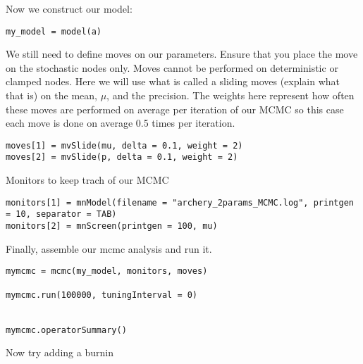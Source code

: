 Now we construct our model:

{\tt \begin{snugshade*}
 \begin{lstlisting}
my_model = model(a)
\end{lstlisting}
\end{snugshade*}}


We still need to define moves on our parameters. Ensure that you place the move on the stochastic nodes only. Moves cannot be performed on deterministic or clamped nodes. Here we will use what is called a sliding moves (explain what that is) on the mean, $\mu$, and the precision. The weights here represent how often these moves are performed on average per iteration of our MCMC so this case each move is done on average 0.5 times per iteration. 


{\tt \begin{snugshade*}
\begin{lstlisting}
moves[1] = mvSlide(mu, delta = 0.1, weight = 2)
moves[2] = mvSlide(p, delta = 0.1, weight = 2)
\end{lstlisting}
\end{snugshade*}}


Monitors to keep trach of our MCMC
{\tt \begin{snugshade*}
 \begin{lstlisting}
monitors[1] = mnModel(filename = "archery_2params_MCMC.log", printgen = 10, separator = TAB)
monitors[2] = mnScreen(printgen = 100, mu)
 \end{lstlisting}
\end{snugshade*}}

Finally, assemble our mcmc analysis and run it.

{\tt \begin{snugshade*}
 \begin{lstlisting}
mymcmc = mcmc(my_model, monitors, moves)

mymcmc.run(100000, tuningInterval = 0)


mymcmc.operatorSummary()
 \end{lstlisting}
\end{snugshade*}}

Now try adding a burnin



